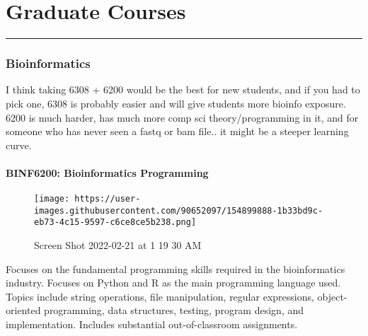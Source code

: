 \documentclass[
  letterpaper,
  DIV=11,
  numbers=noendperiod]{scrreprt}
\begin{document}
\hypertarget{graduate-courses}{%
\chapter{Graduate Courses}\label{graduate-courses}}

\begin{center}\rule{0.5\linewidth}{0.5pt}\end{center}

\hypertarget{bioinformatics}{%
\subsection*{\texorpdfstring{\textbf{Bioinformatics}}{Bioinformatics}}\label{bioinformatics}}

I think taking 6308 + 6200 would be the best for new students, and if
you had to pick one, 6308 is probably easier and will give students more
bioinfo exposure. 6200 is much harder, has much more comp sci
theory/programming in it, and for someone who has never seen a fastq or
bam file.. it might be a steeper learning curve.

\hypertarget{binf6200-bioinformatics-programming}{%
\subsubsection*{\texorpdfstring{\textbf{BINF6200: Bioinformatics
Programming}}{BINF6200: Bioinformatics Programming}}\label{binf6200-bioinformatics-programming}}

\begin{figure}

{\centering \texttt{[image: https://user-images.githubusercontent.com/90652097/154899888-1b33bd9c-eb73-4c15-9597-c6ce8ce5b238.png]}

}

\caption{Screen Shot 2022-02-21 at 1 19 30 AM}

\end{figure}

Focuses on the fundamental programming skills required in the
bioinformatics industry. Focuses on Python and R as the main programming
language used. Topics include string operations, file manipulation,
regular expressions, object-oriented programming, data structures,
testing, program design, and implementation. Includes substantial
out-of-classroom assignments.
\end{document}

